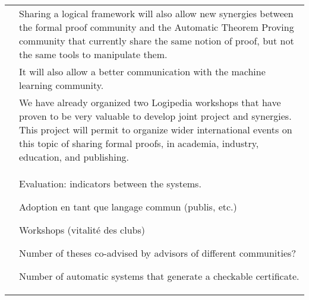 \begin{longtable}{|p{}|p{}|}
&
\hspace{0.4cm}
Sharing a logical framework will also allow new synergies between the
formal proof community and the Automatic Theorem Proving community
that currently share the same notion of proof, but not the same tools
to manipulate them.
\\
&
\hspace{0.4cm}
It will also allow a better communication with the machine learning community.\\
&
\hspace{0.4cm}
We have already organized two Logipedia workshops that have proven to
be very valuable to develop joint project and synergies.  This project
will permit to organize wider international events on this topic of
sharing formal proofs, in academia, industry, education, and
publishing.\\

&\begin{framed}
   Evaluation: indicators between the systems.

   Adoption en tant que langage commun (publis, etc.)

   Workshops (vitalité des clubs)

   Number of theses co-advised by advisors of different communities?

   Number of automatic systems that generate a checkable certificate.
 \end{framed}
\\


\end{longtable}
